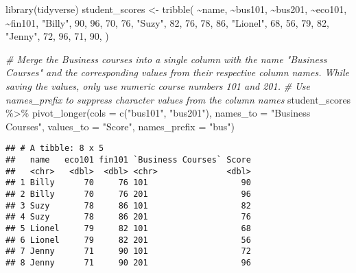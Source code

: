 \documentclass[
]{article}
\newenvironment{Shaded}{\begin{snugshade}}{\end{snugshade}}
\newcommand{\AttributeTok}[1]{\textcolor[rgb]{0.77,0.63,0.00}{#1}}
\newcommand{\CommentTok}[1]{\textcolor[rgb]{0.56,0.35,0.01}{\textit{#1}}}
\newcommand{\DecValTok}[1]{\textcolor[rgb]{0.00,0.00,0.81}{#1}}
\newcommand{\FunctionTok}[1]{\textcolor[rgb]{0.00,0.00,0.00}{#1}}
\newcommand{\NormalTok}[1]{#1}
\newcommand{\OtherTok}[1]{\textcolor[rgb]{0.56,0.35,0.01}{#1}}
\newcommand{\SpecialCharTok}[1]{\textcolor[rgb]{0.00,0.00,0.00}{#1}}
\newcommand{\StringTok}[1]{\textcolor[rgb]{0.31,0.60,0.02}{#1}}
\begin{document}
\begin{Shaded}
\begin{Highlighting}[]
\FunctionTok{library}\NormalTok{(tidyverse)}
\NormalTok{student\_scores }\OtherTok{\textless{}{-}} \FunctionTok{tribble}\NormalTok{(}
  \SpecialCharTok{\textasciitilde{}}\NormalTok{name, }\SpecialCharTok{\textasciitilde{}}\NormalTok{bus101, }\SpecialCharTok{\textasciitilde{}}\NormalTok{bus201, }\SpecialCharTok{\textasciitilde{}}\NormalTok{eco101, }\SpecialCharTok{\textasciitilde{}}\NormalTok{fin101, }
  \StringTok{"Billy"}\NormalTok{, }\DecValTok{90}\NormalTok{, }\DecValTok{96}\NormalTok{, }\DecValTok{70}\NormalTok{, }\DecValTok{76}\NormalTok{, }
  \StringTok{"Suzy"}\NormalTok{, }\DecValTok{82}\NormalTok{, }\DecValTok{76}\NormalTok{, }\DecValTok{78}\NormalTok{, }\DecValTok{86}\NormalTok{,}
  \StringTok{"Lionel"}\NormalTok{, }\DecValTok{68}\NormalTok{, }\DecValTok{56}\NormalTok{, }\DecValTok{79}\NormalTok{, }\DecValTok{82}\NormalTok{, }
  \StringTok{"Jenny"}\NormalTok{, }\DecValTok{72}\NormalTok{, }\DecValTok{96}\NormalTok{, }\DecValTok{71}\NormalTok{, }\DecValTok{90}\NormalTok{,}
\NormalTok{)}

\CommentTok{\# Merge the Business courses into a single column with the name "Business Courses" and the corresponding values from their respective column names. While saving the values, only use numeric course numbers 101 and 201. }
\CommentTok{\# Use names\_prefix to suppress character values from the column names }
\NormalTok{student\_scores }\SpecialCharTok{\%\textgreater{}\%}
\FunctionTok{pivot\_longer}\NormalTok{(}\AttributeTok{cols =} \FunctionTok{c}\NormalTok{(}\StringTok{"bus101"}\NormalTok{, }\StringTok{"bus201"}\NormalTok{),}
             \AttributeTok{names\_to =} \StringTok{"Business Courses"}\NormalTok{,}
             \AttributeTok{values\_to =} \StringTok{"Score"}\NormalTok{,}
             \AttributeTok{names\_prefix =} \StringTok{"bus"}\NormalTok{)}
\end{Highlighting}
\end{Shaded}

\begin{verbatim}
## # A tibble: 8 x 5
##   name   eco101 fin101 `Business Courses` Score
##   <chr>   <dbl>  <dbl> <chr>              <dbl>
## 1 Billy      70     76 101                   90
## 2 Billy      70     76 201                   96
## 3 Suzy       78     86 101                   82
## 4 Suzy       78     86 201                   76
## 5 Lionel     79     82 101                   68
## 6 Lionel     79     82 201                   56
## 7 Jenny      71     90 101                   72
## 8 Jenny      71     90 201                   96
\end{verbatim}
\end{document}

